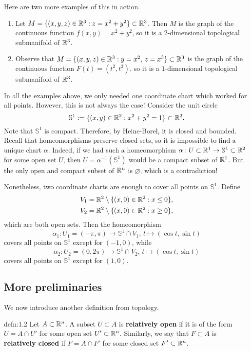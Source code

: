 Here are two more examples of this in action. 
\begin{enumerate}[(1)]
    \item Let $M = \{(x, y, z) \in \mathbb{R}^3 : z = x^2 + y^2\} \subset \mathbb{R}^3$. 
    Then $M$ is the graph of the continuous function $f(x, y) = x^2 + y^2$, 
    so it is a $2$-dimensional topological submanifold of $\mathbb{R}^3$. 
    \item Observe that $M = \{(x, y, z) \in \mathbb{R}^3 : y = x^2,\, z = x^3\} 
    \subset \mathbb{R}^3$ is the graph of the continuous function $F(t) = (t^2, t^3)$, 
    so it is a $1$-dimensional topological submanifold of $\mathbb{R}^3$.
\end{enumerate}
In all the examples above, we only needed one coordinate chart which 
worked for all points. However, this is not always the case! Consider 
the unit circle 
\[ \mathbb{S}^1 := \{(x, y) \in \mathbb{R}^2 : x^2 + y^2 = 1 \} \subset \mathbb{R}^2. \] 
Note that $\mathbb{S}^1$ is compact. Therefore, by Heine-Borel, 
it is closed and bounded. Recall that homeomorphisms preserve closed sets, 
so it is impossible to find a unique chart $\alpha$. Indeed, if we had 
such a homeomorphism $\alpha : U \subset \mathbb{R}^1 \to \mathbb{S}^1 \subset \mathbb{R}^2$ 
for some open set $U$, then $U = \alpha^{-1}(\mathbb{S}^1)$ would be 
a compact subset of $\mathbb{R}^1$. But the only open and compact subset of 
$\mathbb{R}^n$ is $\varnothing$, which is a contradiction! 

Nonetheless, two coordinate charts are enough to cover all points on 
$\mathbb{S}^1$. Define 
\begin{align*}
    V_1 = \mathbb{R}^2 \setminus \{(x, 0) \in \mathbb{R}^2 : x \leq 0\}, \\ 
    V_2 = \mathbb{R}^2 \setminus \{(x, 0) \in \mathbb{R}^2 : x \geq 0\},
\end{align*}
which are both open sets. Then the homeomorphism 
\[ \alpha_1 : U_1 = (-\pi, \pi) \to \mathbb{S}^1 \cap V_1,\,
 t \mapsto (\cos t, \sin t) \]
covers all points on $\mathbb{S}^1$ except for $(-1, 0)$, while 
\[ \alpha_2 : U_2 = (0, 2\pi) \to \mathbb{S}^1 \cap V_2,\,
 t \mapsto (\cos t, \sin t) \]
covers all points on $\mathbb{S}^1$ except for $(1, 0)$. 

\subsection{More preliminaries} \label{subsec:1.3}
We now introduce another definition from topology.

\begin{defn}{defn:1.2}
    Let $A \subset \mathbb{R}^n$. A subset $U \subset A$ is {\bf relatively open} 
    if it is of the form $U = A \cap U'$ for some open set $U' \subset \mathbb{R}^n$. 
    Similarly, we say that $F \subset A$ is {\bf relatively closed} 
    if $F = A \cap F'$ for some closed set $F' \subset \mathbb{R}^n$. 
\end{defn}\vspace{-0.25cm}

